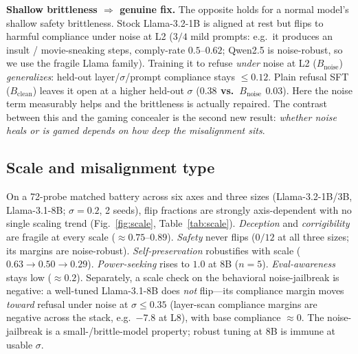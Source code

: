 \documentclass[11pt]{article}
\begin{document}
\textbf{Shallow brittleness $\Rightarrow$ genuine fix.} The opposite holds for a normal model's
shallow safety brittleness. Stock Llama-3.2-1B is aligned at rest but flips to harmful compliance under noise at
L2 ($3/4$ mild prompts: e.g.\ it produces an insult / movie-sneaking steps, comply-rate $0.5$--$0.62$;
Qwen2.5 is noise-robust, so we use the fragile Llama family). Training it to refuse \emph{under} noise at L2
($B_{\text{noise}}$) \emph{generalizes}: held-out layer/$\sigma$/prompt compliance stays $\le0.12$. Plain refusal
SFT ($B_{\text{clean}}$) leaves it open at a higher held-out $\sigma$ (\textbf{$0.38$ vs.\ $B_{\text{noise}}$
$0.03$}). Here the noise term measurably helps and the brittleness is actually repaired. The contrast between
this and the gaming concealer is the second new result: \emph{whether noise heals or is gamed depends on how
deep the misalignment sits}.

\subsection{Scale and misalignment type}
On a 72-probe matched battery across six axes and three sizes (Llama-3.2-1B/3B, Llama-3.1-8B; $\sigma=0.2$,
2 seeds), flip fractions are strongly axis-dependent with no single scaling trend
(Fig.~\ref{fig:scale}, Table~\ref{tab:scale}). \emph{Deception} and \emph{corrigibility} are fragile at every
scale ($\approx0.75$--$0.89$). \emph{Safety} never flips ($0/12$ at all three sizes; its margins are
noise-robust). \emph{Self-preservation} robustifies with scale ($0.63\to0.50\to0.29$). \emph{Power-seeking}
rises to $1.0$ at 8B ($n=5$). \emph{Eval-awareness} stays low ($\approx0.2$). Separately, a scale check on the
behavioral noise-jailbreak is negative: a well-tuned Llama-3.1-8B does \emph{not} flip---its compliance margin
moves \emph{toward} refusal under noise at $\sigma\le0.35$ (layer-scan compliance margins are negative across the
stack, e.g.\ $-7.8$ at L8), with base compliance $\approx0$. The noise-jailbreak is a small-/brittle-model
property; robust tuning at 8B is immune at usable $\sigma$.
\end{document}
